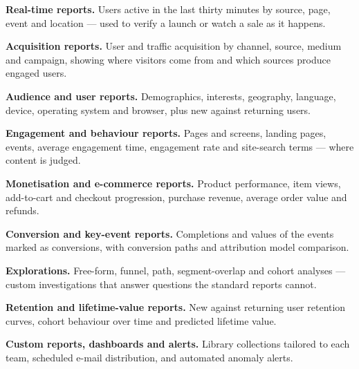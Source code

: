 \begin{qlist}
\begin{apts}
\item \textbf{Real-time reports.} Users active in the last thirty minutes by
      source, page, event and location --- used to verify a launch or watch a
      sale as it happens.
\item \textbf{Acquisition reports.} User and traffic acquisition by channel,
      source, medium and campaign, showing where visitors come from and which
      sources produce engaged users.
\item \textbf{Audience and user reports.} Demographics, interests, geography,
      language, device, operating system and browser, plus new against
      returning users.
\item \textbf{Engagement and behaviour reports.} Pages and screens, landing
      pages, events, average engagement time, engagement rate and site-search
      terms --- where content is judged.
\item \textbf{Monetisation and e-commerce reports.} Product performance, item
      views, add-to-cart and checkout progression, purchase revenue, average
      order value and refunds.
\item \textbf{Conversion and key-event reports.} Completions and values of the
      events marked as conversions, with conversion paths and attribution model
      comparison.
\item \textbf{Explorations.} Free-form, funnel, path, segment-overlap and cohort
      analyses --- custom investigations that answer questions the standard
      reports cannot.
\item \textbf{Retention and lifetime-value reports.} New against returning user
      retention curves, cohort behaviour over time and predicted lifetime value.
\item \textbf{Custom reports, dashboards and alerts.} Library collections
      tailored to each team, scheduled e-mail distribution, and automated
      anomaly alerts.
\end{apts}


\end{qlist}
